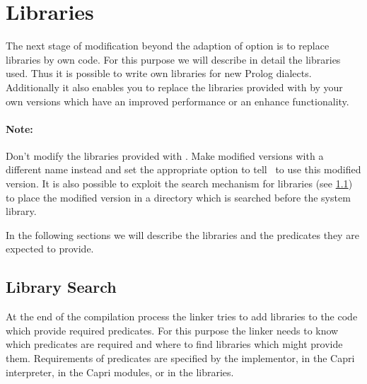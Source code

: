 
\section{Libraries}

The next stage of modification beyond the adaption of option is to replace
libraries by own code. For this purpose we will describe in detail the
libraries used. Thus it is possible to write own libraries for new Prolog
dialects. Additionally it also enables you to replace the libraries provided
with \ProCom{} by your own versions which have an improved performance or an
enhance functionality.

\paragraph{Note:} Don't modify the libraries provided with \ProCom. Make
modified versions with a different name instead and set the appropriate option
to tell \ProCom\ to use this modified version. It is also possible to exploit
the search mechanism for libraries (see \ref{sec:lib.search}) to place the
modified version in a directory which is searched before the system library.

In the following sections we will describe the libraries and the predicates
they are expected to provide.


\subsection{Library Search}\label{sec:lib.search}


At the end of the compilation process the linker tries to add libraries to the
code which provide required predicates. For this purpose the linker needs to
know which predicates are required and where to find libraries which might
provide them. Requirements of predicates are specified by the implementor, in
the Capri interpreter, in the Capri modules, or in the libraries.

